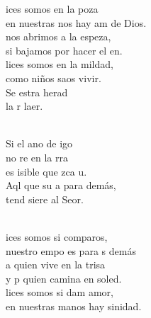 \documentclass[12pt]{article}
\begin{document}
\begin{multicols*}{2}
        \begin{cancion}[Bienaventuranzas][Kairoi]%
            ices somos en la poza\\
            en nuestras nos hay am de Dios.\\
            nos abrimos a la espeza,\\
            si bajamos por hacer el en.\\
            lices somos en la mildad,\\
            como niños saos vivir.\\
            Se estra herad\\
            la r laer.\\\jump\\
            \begin{chorus}%
            Si el ano de igo \\
            no re en la rra\\
            es isible que zca u.\\
            Aql que  su a para  demás,\\
            tend siere al Seor.\\
            \end{chorus}%
            \jump\\
            ices somos si comparos,\\
            nuestro empo es para s demás\\
            a quien vive en la trisa\\
            y p quien camina en soled.\\
            lices somos si dam amor,\\
            en nuestras manos hay sinidad.\\

\end{cancion}
\end{multicols*}
\end{document}
